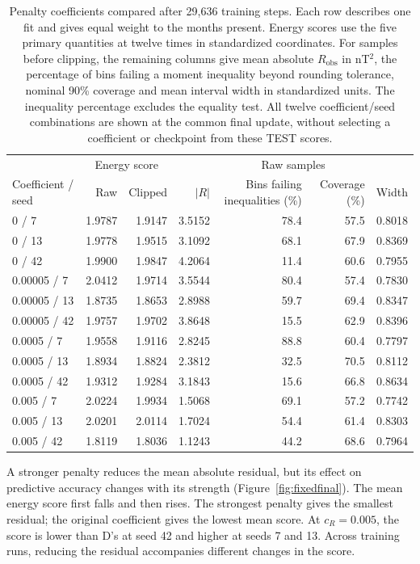 \documentclass{article}
\begin{document}
\begin{table}[ht]
\centering
 \caption{Penalty coefficients compared after 29{,}636 training steps. Each row describes one fit and gives equal weight to the months present. Energy scores use the five primary quantities at twelve times in standardized coordinates. For samples before clipping, the remaining columns give mean absolute $R_{\mathrm{obs}}$ in nT$^2$, the percentage of bins failing a moment inequality beyond rounding tolerance, nominal 90\% coverage and mean interval width in standardized units. The inequality percentage excludes the equality test. All twelve coefficient/seed combinations are shown at the common final update, without selecting a coefficient or checkpoint from these TEST scores.}
\label{tab:fixedfinal}
\begin{tabular}{lrrrrrr}
\toprule
 & \multicolumn{2}{c}{Energy score} & \multicolumn{4}{c}{Raw samples} \\
Coefficient / seed & Raw & Clipped & $|R|$ & \parbox[c]{19mm}{\centering Bins failing inequalities (\%)} & Coverage (\%) & Width \\
 / 7 & 1.9787 & 1.9147 & 3.5152 & 78.4 & 57.5 & 0.8018 \\
0 / 13 & 1.9778 & 1.9515 & 3.1092 & 68.1 & 67.9 & 0.8369 \\
0 / 42 & 1.9900 & 1.9847 & 4.2064 & 11.4 & 60.6 & 0.7955 \\
0.00005 / 7 & 2.0412 & 1.9714 & 3.5544 & 80.4 & 57.4 & 0.7830 \\
0.00005 / 13 & 1.8735 & 1.8653 & 2.8988 & 59.7 & 69.4 & 0.8347 \\
0.00005 / 42 & 1.9757 & 1.9702 & 3.8648 & 15.5 & 62.9 & 0.8396 \\
0.0005 / 7 & 1.9558 & 1.9116 & 2.8245 & 88.8 & 60.4 & 0.7797 \\
0.0005 / 13 & 1.8934 & 1.8824 & 2.3812 & 32.5 & 70.5 & 0.8112 \\
0.0005 / 42 & 1.9312 & 1.9284 & 3.1843 & 15.6 & 66.8 & 0.8634 \\
0.005 / 7 & 2.0224 & 1.9934 & 1.5068 & 69.1 & 57.2 & 0.7742 \\
0.005 / 13 & 2.0201 & 2.0114 & 1.7024 & 54.4 & 61.4 & 0.8303 \\
0.005 / 42 & 1.8119 & 1.8036 & 1.1243 & 44.2 & 68.6 & 0.7964 \\
\bottomrule
\end{tabular}
\end{table}

\begin{samepage}
A stronger penalty reduces the mean absolute residual, but its effect on predictive accuracy changes with its strength (Figure~\ref{fig:fixedfinal}). The mean energy score first falls and then rises. The strongest penalty gives the smallest residual; the original coefficient gives the lowest mean score. At $c_R=0.005$, the score is lower than D's at seed 42 and higher at seeds 7 and 13. Across training runs, reducing the residual accompanies different changes in the score.
\par
\end{samepage}
\end{document}
